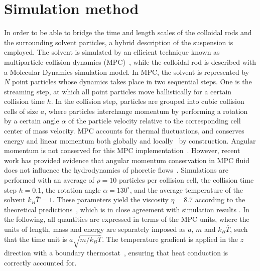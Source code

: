 \documentclass[aps,pre,twocolumn,showpacs,superscriptaddress]{revtex4-1}
\begin{document}
\section{Simulation method} %
\label{sec:mpc}
In order to be able to bridge the time and length scales of the
colloidal rods and the surrounding solvent particles, a hybrid
description of the suspension is employed.  The solvent is simulated
by an efficient technique known as multiparticle-collision dynamics
(MPC)~\cite{kap99,kap00,kapral_review}, while the colloidal rod is
described with a Molecular Dynamics simulation model.  In MPC, the
solvent is represented by $N$ point particles whose dynamics takes
place in two sequential steps. One is the streaming step, at which all
point particles move ballistically for a certain collision time
$h$. In the collision step, particles are grouped into cubic collision
cells of size $a$, where particles interchange momentum by performing a
rotation by a certain angle $\alpha$ of the particle velocity relative
to the corresponding cell center of mass velocity.  MPC accounts for
thermal fluctuations, and conserves energy and linear momentum both
globally and locally~\cite{ihl01,pre05,tuz06} by construction.
Angular momentum is not conserved for this MPC
implementation~\cite{goe07,nog07}.  However, recent work has provided
evidence that angular momentum conservation in MPC fluid does not
influence the hydrodynamics of phoretic flows~\cite{yang15amc}. %
Simulations are performed with an average of $\rho=10$ particles per
collision cell, the collision time step $h=0.1$, the rotation angle
$\alpha=130^\circ$, and the average temperature of the solvent
$k_{B}\overline{T}=1$. These parameters yield the viscosity
$\eta=8.7$ according to the theoretical
predictions~\cite{kap00,ihl01,yeo03,yeo05a,ihl05b,nog07b,winkler09},
which is in close agreement with simulation results \cite{huang15}.
In the following, all quantities are expressed in terms of the MPC
units, where the units of length, mass and energy are separately
imposed as $a$, $m$ and $k_{B}\overline{T}$, such that the time unit
is $a\sqrt{m/k_{B}\overline{T}}$.  The temperature gradient is applied
in the $z$ direction with a boundary
thermostat~\cite{luese12jcp,yang13flow,plathe97}, ensuring that heat
conduction is correctly accounted for.
\end{document}
